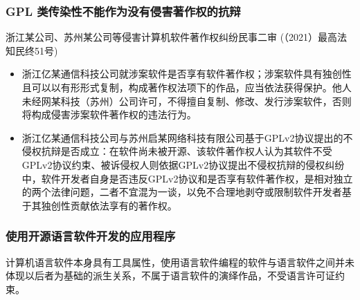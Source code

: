 \documentclass[xcolor=table,dvipsnames,svgnames,aspectratio=169]{ctexbeamer}
\begin{document}
\begin{frame}
  \frametitle{GPL 类传染性不能作为没有侵害著作权的抗辩}

  浙江某公司、苏州某公司等侵害计算机软件著作权纠纷民事二审 (（2021）最高法知民终51号)%

  \begin{itemize}
    \item 浙江亿某通信科技公司就涉案软件是否享有软件著作权；涉案软件具有独创性且可以以有形形式复制，构成著作权法项下的作品，应当依法获得保护。他人未经网某科技（苏州）公司许可，不得擅自复制、修改、发行涉案软件，否则将构成侵害涉案软件著作权的违法行为。
    \item 浙江亿某通信科技公司与苏州启某网络科技有限公司基于GPLv2协议提出的不侵权抗辩是否成立：在软件尚未被开源、该软件著作权人认为其软件不受GPLv2协议约束、被诉侵权人则依据GPLv2协议提出不侵权抗辩的侵权纠纷中，软件开发者自身是否违反GPLv2协议和是否享有软件著作权，是相对独立的两个法律问题，二者不宜混为一谈，以免不合理地剥夺或限制软件开发者基于其独创性贡献依法享有的著作权。
  \end{itemize}
\end{frame}

\begin{frame}
  \frametitle{使用开源语言软件开发的应用程序}

  计算机语言软件本身具有工具属性，使用语言软件编程的软件与语言软件之间并未体现以后者为基础的派生关系，不属于语言软件的演绎作品，不受语言许可证约束。
  
\end{frame}
\end{document}

